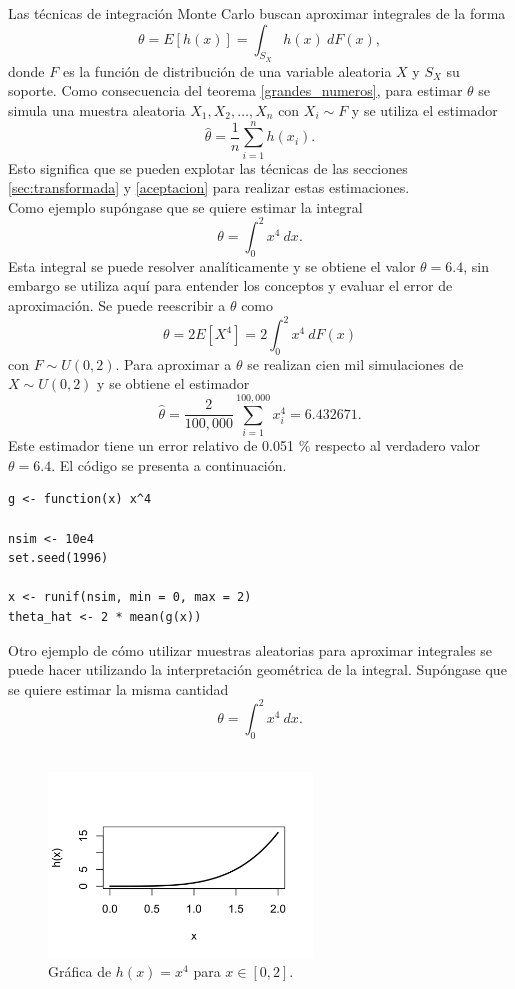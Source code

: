 \documentclass[11pt,a4paper]{article}
\begin{document}
Las técnicas de integración Monte Carlo buscan aproximar integrales de la forma
$$\theta = E[h(x)] = \int_{S_X} h(x) \ dF(x),$$ donde $F$ es la función de distribución de una variable aleatoria $X$ y $S_X$ su soporte. Como consecuencia del teorema \ref{grandes_numeros}, para estimar $\theta$ se simula una muestra aleatoria $X_1, X_2, \dots, X_n$ con $X_i\sim F$ y se utiliza el estimador $$\hat{\theta} = \frac{1}{n}\sum_{i=1}^n h(x_i).$$ Esto significa que se pueden explotar las técnicas de las secciones \ref{sec:transformada} y \ref{aceptacion} para realizar estas estimaciones.\\

Como ejemplo supóngase que se quiere estimar la integral $$\theta = \int_0^2 x^4 \ dx.$$ Esta integral se puede resolver analíticamente y se obtiene el valor $\theta = 6.4$, sin embargo se utiliza aquí para entender los conceptos y evaluar el error de aproximación. Se puede reescribir a $\theta$ como $$\theta = 2E[X^4] =  2\int_0^2 x^4 \ dF(x)$$ con $F\sim U(0,2).$ Para aproximar a $\theta$ se realizan cien mil simulaciones de $X\sim U(0,2)$ y se obtiene el estimador $$\hat{\theta} = \frac{2}{100,000}\sum_{i=1}^{100,000} x_i^4 = 6.432671.$$ Este estimador tiene un error relativo de 0.051 \% respecto al verdadero valor $\theta = 6.4$. El código se presenta a continuación.\\

\begin{lstlisting}
g <- function(x) x^4

nsim <- 10e4
set.seed(1996)

x <- runif(nsim, min = 0, max = 2)
theta_hat <- 2 * mean(g(x))
\end{lstlisting} \leavevmode\newline

Otro ejemplo de cómo utilizar muestras aleatorias para aproximar integrales se puede hacer utilizando la interpretación geométrica de la integral. Supóngase que se quiere estimar la misma cantidad $$\theta = \int_0^2 x^4 \ dx.$$\\

\begin{figure}[h]
\centering\includegraphics[width=7cm]{hx.png}
\caption{Gráfica de $h(x) = x^4$ para $x\in [0,2]$.}
\label{fig:hx}
\end{figure}
\end{document}
